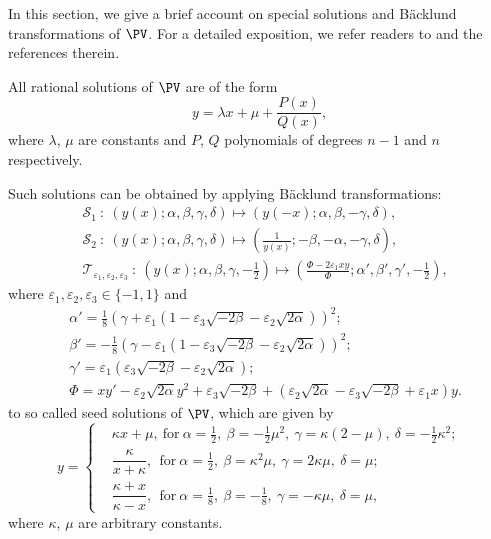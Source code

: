 In this section, we give a brief account on special solutions and B\"acklund transformations of $\PV$.
For a detailed exposition, we refer readers to 
\cite{Luk1968, Airault1979, Okamoto1987, Gromak1999, Schief2000,  FW2002, MOK2002, Clark2005b, NISThandbook} and the references therein. 


All rational solutions of $\PV$ are of the form
$$
y=\lambda x+\mu+\frac{P(x)}{Q(x)},
$$
where $\lambda$, $\mu$ are constants and $P$, $Q$ polynomials of degrees $n-1$ and $n$ respectively.

Such solutions can be obtained by applying B\"acklund transformations:
$$
\begin{aligned}
& \mathcal{S}_1\ :\ (y(x);\alpha,\beta,\gamma,\delta)\mapsto(y(-x);\alpha,\beta,-\gamma,\delta),
\\
&\mathcal{S}_2\ :\ (y(x);\alpha,\beta,\gamma,\delta)\mapsto\left(\frac{1}{y(x)};-\beta,-\alpha,-\gamma,\delta\right),
\\
&\mathcal{T}_{\varepsilon_1,\varepsilon_2,\varepsilon_3}\ :\ \left(y(x);\alpha,\beta,\gamma,-\frac12\right)
\mapsto
\left(\frac{\Phi-2\varepsilon_1 xy}{\Phi};\alpha',\beta',\gamma',-\frac12\right),
\end{aligned}
$$
where $\varepsilon_1, \varepsilon_2, \varepsilon_3\in\{-1,1\}$ and
$$
\begin{aligned}
&\alpha'=\frac18\left(\gamma+\varepsilon_1\left(1-\varepsilon_3\sqrt{-2\beta}-\varepsilon_2\sqrt{2\alpha}\right)\right)^2;
\\
&\beta'=-\frac18\left(\gamma-\varepsilon_1\left(1-\varepsilon_3\sqrt{-2\beta}-\varepsilon_2\sqrt{2\alpha}\right)\right)^2;
\\
&\gamma'=\varepsilon_1\left(\varepsilon_3\sqrt{-2\beta}-\varepsilon_2\sqrt{2\alpha}\right);
\\
&\Phi=xy'-\varepsilon_2\sqrt{2\alpha} y^2+\varepsilon_3\sqrt{-2\beta}
+
(\varepsilon_2\sqrt{2\alpha}-\varepsilon_3\sqrt{-2\beta}+\varepsilon_1x)y.
\end{aligned}
$$
to so called seed solutions of $\PV$, which are given by
\begin{equation}\label{eq:rational}
y=\begin{cases}
&\kappa x+\mu, \ \text{for}\ \alpha=\frac12,\ \beta=-\frac12\mu^2,\ \gamma=\kappa(2-\mu),\ \delta=-\frac12\kappa^2;
\\
&\dfrac{\kappa}{x+\kappa}, \  \ \text{for}\ \alpha=\frac12,\ \beta=\kappa^2\mu,\ \gamma=2\kappa\mu,\ \delta=\mu;
\\
&\dfrac{\kappa+x}{\kappa-x}, \ \ \text{for} \ \alpha=\frac18,\ \beta=-\frac18,\ \gamma=-\kappa\mu,\ \delta=\mu,
\end{cases}
\end{equation}
where $\kappa$, $\mu$ are arbitrary constants.

